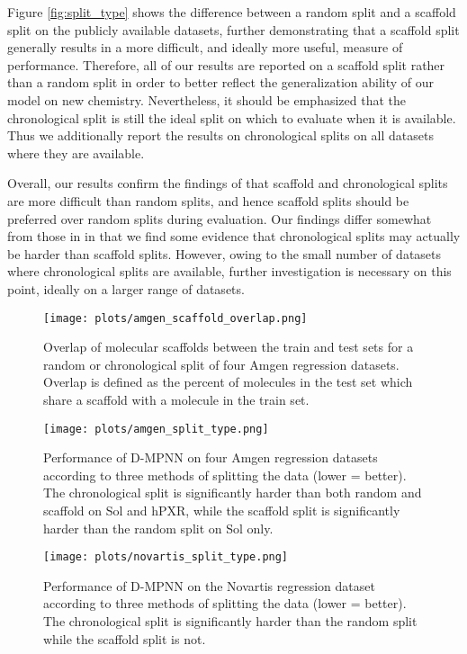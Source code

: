 \documentclass[journal=jcisd8,manuscript=article]{achemso}
\begin{document}
Figure \ref{fig:split_type} shows the difference between a random split and a scaffold split on the publicly available datasets, further demonstrating that a scaffold split generally results in a more difficult, and ideally more useful, measure of performance. Therefore, all of our results are reported on a scaffold split rather than a random split in order to better reflect the generalization ability of our model on new chemistry. Nevertheless, it should be emphasized that the chronological split is still the ideal split on which to evaluate when it is available. Thus we additionally report the results on chronological splits on all datasets where they are available. 

Overall, our results confirm the findings of \citeauthor{sheridan2015relative}\cite{sheridan2015relative} that scaffold and chronological splits are more difficult than random splits, and hence scaffold splits should be preferred over random splits during evaluation. Our findings differ somewhat from those in \citeauthor{sheridan2015relative}\cite{sheridan2015relative} in that we find some evidence that chronological splits may actually be harder than scaffold splits. However, owing to the small number of datasets where chronological splits are available, further investigation is necessary on this point, ideally on a larger range of datasets.

\FloatBarrier

\begin{figure}
    \centering
    \texttt{[image: plots/amgen\_scaffold\_overlap.png]}
    \caption{Overlap of molecular scaffolds between the train and test sets for a random or chronological split of four Amgen regression datasets. Overlap is defined as the percent of molecules in the test set which share a scaffold with a molecule in the train set.}
    \label{fig:amgen_scaffold_overlap}
\end{figure}

\begin{figure}
    \centering
    \texttt{[image: plots/amgen\_split\_type.png]}
    \caption{Performance of D-MPNN on four Amgen regression datasets according to three methods of splitting the data (lower = better). The chronological split is significantly harder than both random and scaffold on Sol and hPXR, while the scaffold split is significantly harder than the random split on Sol only.}
    \label{fig:amgen_split_type}
\end{figure}

\begin{figure}
    \centering
    \texttt{[image: plots/novartis\_split\_type.png]}
    \caption{Performance of D-MPNN on the Novartis regression dataset according to three methods of splitting the data (lower = better). The chronological split is significantly harder than the random split while the scaffold split is not.}
    \label{fig:novartis_split_type}
\end{figure}
\end{document}
